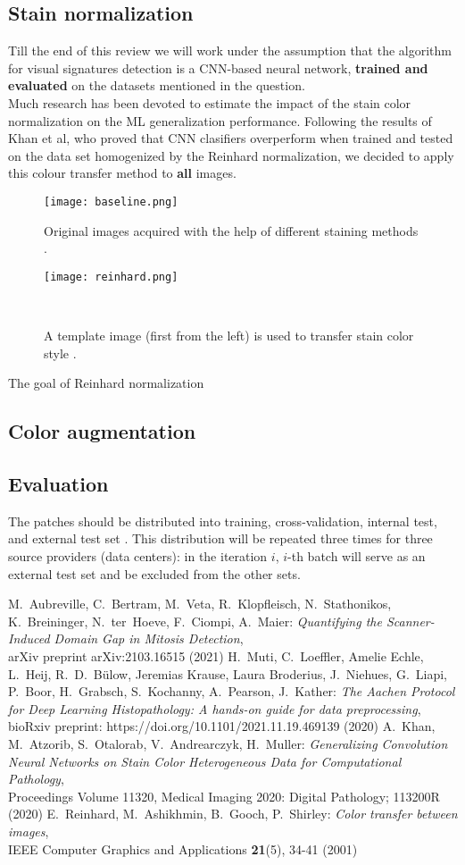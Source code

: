 \documentclass[11pt]{article}
\begin{document}
\subsection{Stain normalization}
Till the end of this review we will work under the assumption that the algorithm for visual signatures detection is a CNN-based neural network, \textbf{trained and evaluated} on the datasets mentioned in the question.
\\ Much research has been devoted to estimate the impact of the stain color normalization on the ML generalization performance. Following the results of Khan et al, who proved that CNN clasifiers overperform when 
trained and tested on the data set homogenized by the Reinhard normalization, we decided to apply this colour transfer method to \textbf{all} images.
\begin{figure}[h]
\centering
\texttt{[image: baseline.png]}
				\caption{Original images acquired with the help of different staining methods \cite{khan}.}
\texttt{[image: reinhard.png]}
				\caption{A template image (first from the left) is used to transfer stain color style \cite{khan}.}
\			
\end{figure}
The goal of Reinhard normalization
\subsection{Color augmentation}
\subsection{Evaluation}
The patches should be distributed into training, cross-validation,
internal test, and external test set \cite{khan}. This distribution will be repeated three times for three source providers (data centers): 
in the iteration $i$, $i$-th batch will serve as an external test set and be excluded from the other sets. 

\begin{thebibliography}{99}
 M.~Aubreville, C.~Bertram, M.~Veta, R.~Klopfleisch, N.~Stathonikos, K.~Breininger, N.~ter~Hoeve, F.~Ciompi, A.~Maier:
\emph{Quantifying the Scanner-Induced Domain Gap in Mitosis Detection},
\\ arXiv preprint arXiv:2103.16515 (2021)
H.~Muti, C.~Loeffler, Amelie Echle, L.~Heij, R.~D.~Bülow, Jeremias Krause, Laura Broderius, J.~Niehues, G.~Liapi, P.~Boor, H.~Grabsch, S.~Kochanny, A.~Pearson, J.~Kather:
\emph{The Aachen Protocol for Deep Learning Histopathology: A hands-on guide for data preprocessing},
\\ bioRxiv preprint: https://doi.org/10.1101/2021.11.19.469139 (2020)
\bibitem{khan}
A.~Khan, M.~Atzorib, S.~Otalorab, V.~Andrearczyk, H.~Muller:
\emph{Generalizing Convolution Neural Networks on Stain Color Heterogeneous Data for Computational Pathology},
\\ Proceedings Volume 11320, Medical Imaging 2020: Digital Pathology; 113200R (2020)
\bibitem{reinhard}
E.~Reinhard, M.~Ashikhmin, B.~Gooch, P.~Shirley:
 \emph{Color transfer between images},
\\ IEEE Computer
Graphics and Applications \textbf{21}(5), 34-41 (2001)
\end{thebibliography}
\end{document}
